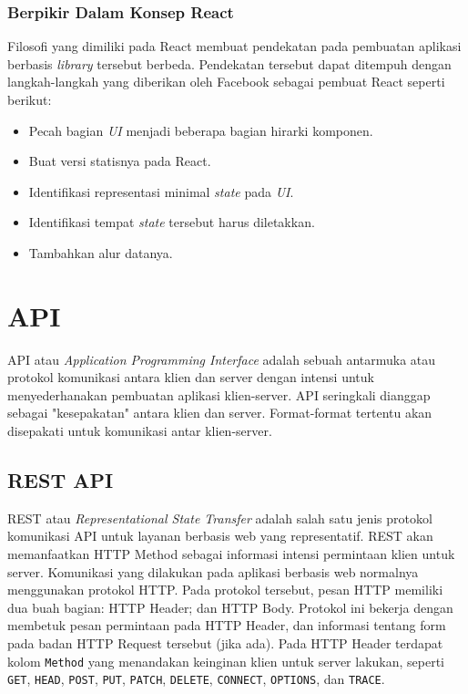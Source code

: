     
    \subsubsection{Berpikir Dalam Konsep React}
    Filosofi yang dimiliki pada React membuat pendekatan pada pembuatan aplikasi
    berbasis \textit{library} tersebut berbeda. Pendekatan tersebut dapat
    ditempuh dengan langkah-langkah yang diberikan oleh Facebook sebagai pembuat
    React\cite{facebook:react-thinking-in-react} seperti berikut:
    
    \begin{itemize}
        \item Pecah bagian \textit{UI} menjadi beberapa bagian hirarki komponen.
        
        \item Buat versi statisnya pada React.
        
        \item Identifikasi representasi minimal \textit{state} pada \textit{UI}.
        
        \item Identifikasi tempat \textit{state} tersebut harus diletakkan.
        
        \item Tambahkan alur datanya.
    \end{itemize}
    
    
\section{API}
    API atau \textit{Application Programming Interface} adalah sebuah antarmuka
    atau protokol komunikasi antara klien dan server dengan intensi untuk
    menyederhanakan pembuatan aplikasi klien-server. API seringkali dianggap
    sebagai "kesepakatan" antara klien dan server. Format-format tertentu akan
    disepakati untuk komunikasi antar klien-server\cite{health-informatics}.
    
    \subsection{REST API}
    REST atau \textit{Representational State Transfer} adalah salah satu jenis
    protokol komunikasi API untuk layanan berbasis web yang
    representatif\cite{rest:roy-fielding}. REST akan memanfaatkan HTTP Method
    sebagai informasi intensi permintaan klien untuk server. Komunikasi yang
    dilakukan pada aplikasi berbasis web normalnya menggunakan protokol HTTP.
    Pada protokol tersebut, pesan HTTP memiliki dua buah bagian: HTTP Header;
    dan HTTP Body\cite{RFC7231}. Protokol ini bekerja dengan membetuk pesan
    permintaan pada HTTP Header, dan informasi tentang form pada badan HTTP
    Request tersebut (jika ada). Pada HTTP Header terdapat kolom \texttt{Method}
    yang menandakan keinginan klien untuk server lakukan, seperti \texttt{GET},
    \texttt{HEAD}, \texttt{POST}, \texttt{PUT}, \texttt{PATCH}, \texttt{DELETE},
    \texttt{CONNECT}, \texttt{OPTIONS}, dan \texttt{TRACE}\cite[P.~21]{RFC7231}.
    

